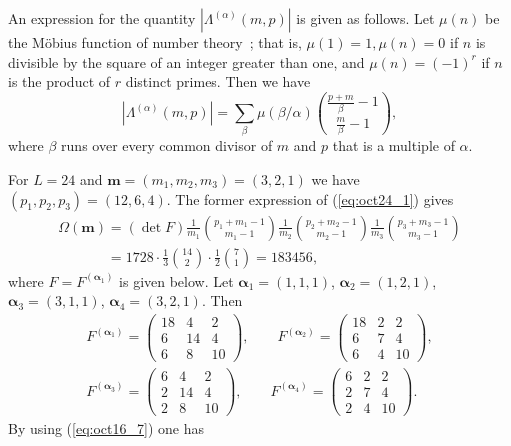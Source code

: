 \documentclass[pdftex]{sigma}
\newcommand\boa{\boldsymbol{\alpha}}
\newcommand{\m}{{\boldsymbol m}}
\begin{document}
An expression for the quantity $|\Lambda^{(\alpha)} (m,p)|$ is given as follows.
Let $\mu (n)$ be the M\"obius function of number theory~\cite{S}; that is,
$\mu (1)=1, \mu (n)=0$ if $n$ is divisible by the square of an integer greater than one,
and $\mu (n) = (-1)^r$ if $n$ is the product of $r$ distinct primes.
Then we have
\begin{equation}\label{eq:oct16_7}
|\Lambda^{(\alpha)} (m,p)| = \sum_\beta \mu(\beta/\alpha) {\frac{p+m}{\beta} -1 \choose \frac{m}{\beta} -1},
\end{equation}
where $\beta$ runs over every common divisor of $m$ and $p$ that is a multiple of $\alpha$.

\begin{example}\label{ex:oct16_6}
For $L=24$ and $\m = (m_1, m_2, m_3) = (3,2,1)$ we have $(p_1, p_2, p_3) = (12,6,4)$.
The former expression of (\ref{eq:oct24_1}) gives
\begin{gather*}
\Omega(\m) = (\det F)
\frac{1}{m_1} \binom{p_1 + m_1 - 1}{m_1 - 1}
\frac{1}{m_2} \binom{p_2 + m_2 - 1}{m_2 - 1}
\frac{1}{m_3} \binom{p_3 + m_3 - 1}{m_3 - 1}\\
\phantom{\Omega(\m)}{}
= 1728 \cdot \frac13 \binom{14}{2} \cdot \frac12 \binom{7}{1} =183456,
\end{gather*}
where $F = F^{(\boa_1)}$ is given below.
Let $\boa_1 = (1,1,1)$, $\boa_2 = (1,2,1)$, $\boa_3 = (3,1,1)$, $\boa_4 = (3,2,1)$.
Then
\begin{gather*}
F^{(\boa_1)} =
\begin{pmatrix}
18 & 4 & 2 \\
6 & 14 & 4 \\
6 & 8 & 10
\end{pmatrix}
,\qquad
F^{(\boa_2)} =
\begin{pmatrix}
18 & 2 & 2 \\
6 & 7 & 4 \\
6 & 4 & 10
\end{pmatrix}
,\\
F^{(\boa_3)} =
\begin{pmatrix}
6 & 4 & 2 \\
2 & 14 & 4 \\
2 & 8 & 10
\end{pmatrix}
,\qquad
F^{(\boa_4)} =
\begin{pmatrix}
6 & 2 & 2 \\
2 & 7 & 4 \\
2 & 4 & 10
\end{pmatrix}.
\end{gather*}
By using (\ref{eq:oct16_7}) one has

\end{example}
\end{document}
